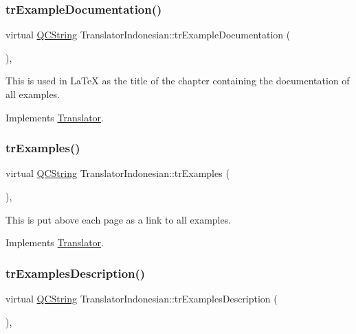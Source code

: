 \subsubsection{\texorpdfstring{trExampleDocumentation()}{trExampleDocumentation()}}
{\footnotesize\ttfamily virtual \mbox{\hyperlink{class_q_c_string}{Q\+C\+String}} Translator\+Indonesian\+::tr\+Example\+Documentation (\begin{DoxyParamCaption}{ }\end{DoxyParamCaption})\hspace{0.3cm}{\ttfamily [inline]}, {\ttfamily [virtual]}}

This is used in La\+TeX as the title of the chapter containing the documentation of all examples. 

Implements \mbox{\hyperlink{class_translator}{Translator}}.

\mbox{\label{class_translator_indonesian_a2956aa73bd36da2b1c5daab267d50921}} 
\subsubsection{\texorpdfstring{trExamples()}{trExamples()}}
{\footnotesize\ttfamily virtual \mbox{\hyperlink{class_q_c_string}{Q\+C\+String}} Translator\+Indonesian\+::tr\+Examples (\begin{DoxyParamCaption}{ }\end{DoxyParamCaption})\hspace{0.3cm}{\ttfamily [inline]}, {\ttfamily [virtual]}}

This is put above each page as a link to all examples. 

Implements \mbox{\hyperlink{class_translator}{Translator}}.

\mbox{\label{class_translator_indonesian_a96cb82c37275ecaa7849a43620e8a6e5}} 
\subsubsection{\texorpdfstring{trExamplesDescription()}{trExamplesDescription()}}
{\footnotesize\ttfamily virtual \mbox{\hyperlink{class_q_c_string}{Q\+C\+String}} Translator\+Indonesian\+::tr\+Examples\+Description (\begin{DoxyParamCaption}{ }\end{DoxyParamCaption})\hspace{0.3cm}{\ttfamily [inline]}, {\ttfamily [virtual]}}

